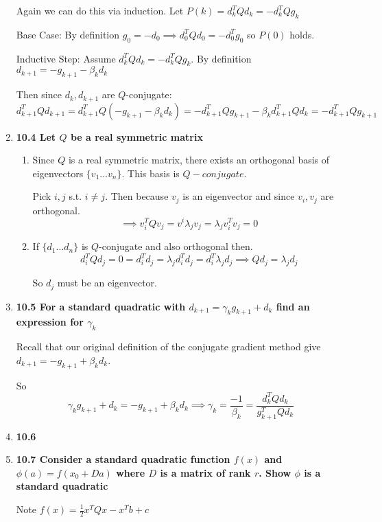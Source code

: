 \documentclass[10pt,a4paper]{article}
\begin{document}
\begin{enumerate}
    Again we can do this via induction. Let $P(k) = d_k^TQd_k = - d_k^TQg_k$

    Base Case: By definition $g_0  = - d_0 \implies d_0^TQd_0 = -d_0^Tg_0$ so $P(0)$ holds.

    Inductive Step: Assume $d_k^TQd_k = -d_k^TQg_k$. By definition $d_{k+1} = - g_{k+1} - \beta_k d_k$

    Then since $d_k, d_{k+1}$ are $Q$-conjugate:
    $$d_{k+1}^TQd_{k+1} = d_{k+1}^TQ(-g_{k+1} - \beta_k d_k) = -d_{k+1}^TQg_{k+1} - \beta_kd_{k+1}^TQd_k = -d_{k+1}^TQg_{k+1}$$

    
    
    \item \textbf{10.4 Let $Q$ be a real symmetric matrix}
    \begin{enumerate}
        \item Since $Q$ is a real symmetric matrix, there exists an orthogonal basis of eigenvectors $\{v_1 \ldots v_n\}$.
        This basis is $Q-conjugate$. 

        Pick $i, j$ s.t. $i \neq j$. Then because $v_j$ is an eigenvector and since $v_i, v_j$ are orthogonal.
        $$\implies v_i^TQv_j = v^i\lambda_jv_j = \lambda_j v_i^Tv_j = 0$$

        \item If $\{d_1 \ldots d_n\}$ is $Q$-conjugate and also orthogonal then.
        $$d_i^TQd_j = 0 = d_i^Td_j = \lambda_j d_i^Td_j = d_i^T \lambda_j d_j \implies Qd_j = \lambda_jd_j$$

        So $d_j$ must be an eigenvector.
    \end{enumerate}
    \item \textbf{10.5 For a standard quadratic with $d_{k+1} = \gamma_k g_{k+1}+d_k$ find an expression for $\gamma_k$}
    
    Recall that our original definition of the conjugate gradient method give $d_{k+1} = -g_{k+1} + \beta_k d_k$.

    So $$\gamma_k g_{k+1}+d_k =  -g_{k+1} + \beta_k d_k \implies \gamma_k = \frac{-1}{\beta_k} = \frac{d_k^TQd_k}{g_{k+1}^TQd_k}$$


    \item \textbf{10.6 }
    \item \textbf{10.7 Consider a standard quadratic function $f(x)$ and $\phi(a) = f(x_0+Da)$ where $D$ is a matrix of rank $r$. Show $\phi$ is a standard quadratic }
    
    Note $f(x) = \frac{1}{2}x^TQx - x^Tb +c$


\end{enumerate}
\end{document}
